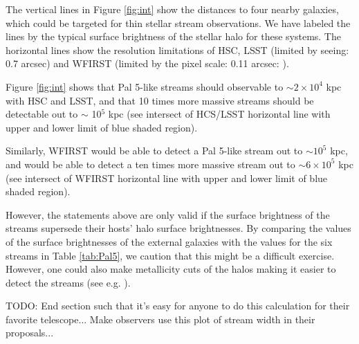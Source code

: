 \documentclass[twocolumn]{aastex62}
\newcommand{\todo}[1]{{\color{red} TODO: #1}}
\begin{document}
The vertical lines in Figure \ref{fig:int} show the distances to four nearby galaxies, which could be targeted for thin stellar stream observations. We have labeled the lines by the typical surface brightness of the stellar halo for these systems. The horizontal lines show the resolution limitations of HSC, LSST (limited by seeing: 0.7 arcsec) and WFIRST (limited by the pixel scale: 0.11 arcsec: \citealt{spergel13}).

Figure \ref{fig:int} shows that Pal 5-like streams should observable to $\sim 2\times 10^4$ kpc with HSC and LSST, and that 10 times more massive streams should be detectable out to $\sim$ 10$^5$ kpc (see intersect of HCS/LSST horizontal line with upper and lower limit of blue shaded region). 

Similarly, WFIRST would be able to detect a Pal 5-like stream out to $\sim 10^5$ kpc, and would be able to detect a ten times more massive stream out to $\sim 6 \times 10^5$ kpc (see intersect of WFIRST horizontal line with upper and lower limit of blue shaded region). 

However, the statements above are only valid if the surface brightness of the streams supersede their hosts' halo surface brightnesses. By comparing the values of the surface brightnesses of the external galaxies with the values for the six streams in Table \ref{tab:Pal5}, we caution that this might be a difficult exercise. However, one could also make metallicity cuts of the halos making it easier to detect the streams (see e.g. \citealt{ibata14}).

\todo{End section such that it's easy for anyone to do this calculation for their favorite telescope... Make observers use this plot of stream width in their proposals...}

\end{document}
